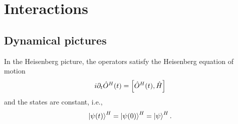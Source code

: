 \section{Interactions}

\subsection{Dynamical pictures}

\begin{definition}
	In the Heisenberg picture, the operators satisfy the Heisenberg equation of motion
	\begin{equation}
		i\partial_t
		\hat{O}^H(t)
		=
		\comm{\hat{O}^H(t)}{\hat{H}}
	\end{equation}
	and the states are constant, i.e.,
	\begin{equation}
		\ket{\psi(t)}^H
		=
		\ket{\psi(0)}^H
		=
		\ket{\psi}^H
		.
	\end{equation}
\end{definition}

